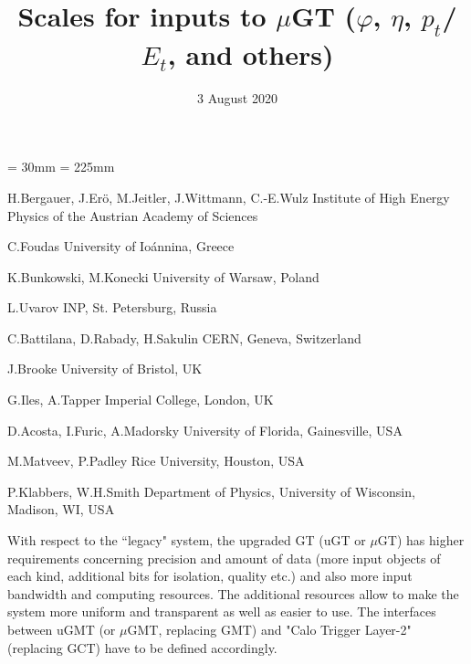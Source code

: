 \documentclass{cmspaper}
\begin{document}
\topmargin = 30mm
\textheight = 225mm

\def\detectornote#1{{Available on CMS information server
\hfill\Large\bf CMS DN #1}
\begin{center}\texttt{[image: cms\_dn.eps]}\end{center}}

\begin{titlepage}

\date{3 August 2020}
\title{Scales for inputs to $\mu$GT
($\varphi$, $\eta$, $p_t$/$E_t$, and others)}

\begin{Authlist}
{H.Bergauer, J.Er\"{o}, M.Jeitler, 
J.Wittmann, C.-E.Wulz}
{Institute of High Energy Physics of the Austrian Academy of Sciences}

C.Foudas
{University of Io\'annina, Greece}

K.Bunkowski, M.Konecki
{University of Warsaw, Poland}

L.Uvarov
{INP, St. Petersburg, Russia}

C.Battilana, D.Rabady, H.Sakulin
{CERN, Geneva, Switzerland}

J.Brooke
{University of Bristol, UK} 

G.Iles, A.Tapper
{Imperial College, London, UK}


D.Acosta, I.Furic, A.Madorsky
{University of Florida, Gainesville, USA}

M.Matveev, P.Padley
{Rice University, Houston, USA}

P.Klabbers, W.H.Smith
{Department of Physics, University of Wisconsin, Madison, WI, USA }

\end{Authlist}

\end{titlepage}

With respect to the ``legacy" system, the upgraded GT (uGT or $\mu$GT) has higher requirements concerning precision and amount of data (more input objects of each kind, additional bits for isolation, quality etc.) and also more input bandwidth and computing resources. The additional resources  allow to make the system more uniform and transparent as well as easier to use. The interfaces between uGMT (or $\mu$GMT, replacing GMT) and "Calo Trigger Layer-2" (replacing GCT) have to be defined accordingly.
\end{document}
